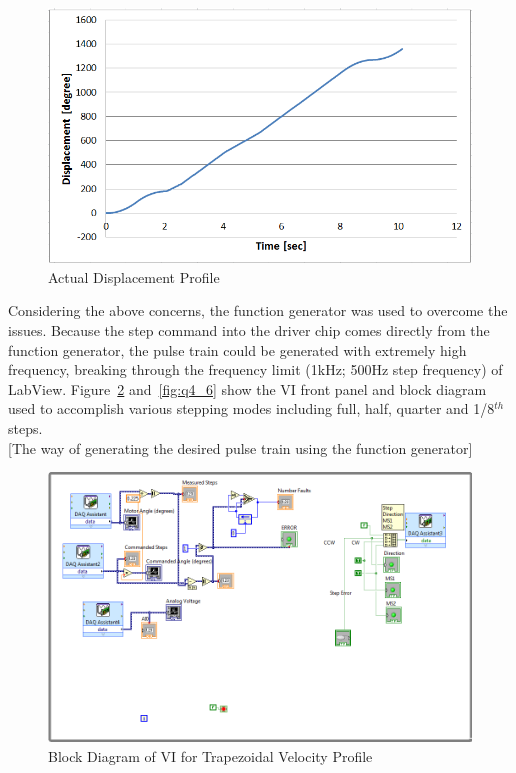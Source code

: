 \documentclass{article}
\theoremstyle{plain}
\theoremstyle{definition}
\theoremstyle{remark}
\begin{document}
\begin{figure}[h!]
\includegraphics[width=1\textwidth]{Q4_Trapezoid_Displacement_Fail.png}
\caption{Actual Displacement Profile} \label{tex}
\label{fig:q4_4}
\end{figure}

Considering the above concerns, the function generator was used to overcome the issues. Because the step command into the driver chip comes directly from the function generator, the pulse train could be generated with extremely high frequency, breaking through the frequency limit (1kHz; 500Hz step frequency) of LabView. Figure~\ref{fig:q4_5} and~\ref{fig:q4_6} show the VI front panel and block diagram used to accomplish various stepping modes including full, half, quarter and 1/8$^{th}$ steps.\\

[The way of generating the desired pulse train using the function generator]  \\

\begin{figure}[h!]
\includegraphics[width=1\textwidth]{Q4_BlockDiagram_VI.png}
\caption{Block Diagram of VI for Trapezoidal Velocity Profile} \label{tex}
\label{fig:q4_5}
\end{figure}
\end{document}
